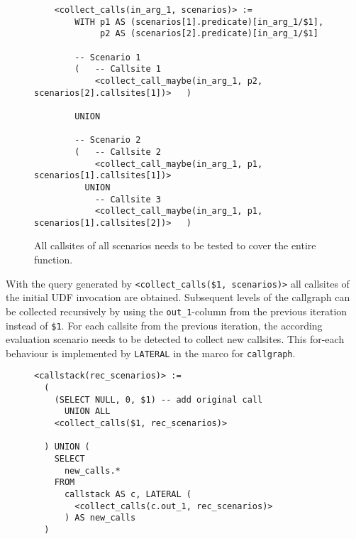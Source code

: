 \begin{figure}[h!]\centering\small
    \begin{verbatim}
    <collect_calls(in_arg_1, scenarios)> :=
        WITH p1 AS (scenarios[1].predicate)[in_arg_1/$1],
             p2 AS (scenarios[2].predicate)[in_arg_1/$1]
             
        -- Scenario 1
        (   -- Callsite 1
            <collect_call_maybe(in_arg_1, p2, scenarios[2].callsites[1])>   )
        
        UNION
        
        -- Scenario 2
        (   -- Callsite 2
            <collect_call_maybe(in_arg_1, p1, scenarios[1].callsites[1])>
          UNION
            -- Callsite 3
            <collect_call_maybe(in_arg_1, p1, scenarios[1].callsites[2])>   )
\end{verbatim}
  \caption{All callsites of all scenarios needs to be tested to cover the entire function.}
  \label{macro:collect_calls}
\end{figure}

With the query generated by \texttt{<collect\_calls(\$1, scenarios)>} all callsites of the initial UDF invocation are obtained. Subsequent levels of the callgraph can be collected recursively by using the \texttt{out\_1}-column from the previous iteration instead of \texttt{\$1}. For each callsite from the previous iteration, the according evaluation scenario needs to be detected to collect new callsites. This for-each behaviour is implemented by \texttt{LATERAL} in the marco for \texttt{callgraph}.

\begin{figure}[h!]\centering
\begin{verbatim}
<callstack(rec_scenarios)> :=
  (
    (SELECT NULL, 0, $1) -- add original call
      UNION ALL
    <collect_calls($1, rec_scenarios)> 

  ) UNION (
    SELECT
      new_calls.*
    FROM
      callstack AS c, LATERAL (
        <collect_calls(c.out_1, rec_scenarios)>
      ) AS new_calls
  )
\end{verbatim}
  \caption{}
  \label{}
\end{figure}


\iffalse
\begin{figure}[h!]
    \centering
    
    \caption{Structure of the callstack CTE. In the beginning, the original parameters \$1 are used. The recursive step iterates over all newly discovered calls.}
    \label{discovery_strucutre}
\end{figure}
\fi

